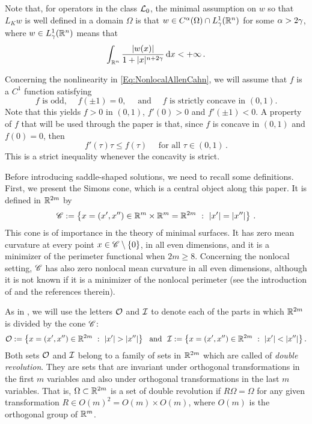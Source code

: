 Note that, for operators in the class $\mathcal{L}_0$, the minimal assumption on $w$ so that $L_K w$ is well defined in a domain $\Omega$ is that $w\in C^\alpha (\Omega)\cap L^1_\gamma(\mathbb{R}^n)$ for some $\alpha > 2\gamma$, where $w\in L^1_\gamma(\mathbb{R}^n)$ means that
$$
\int_{\mathbb{R}^n} \dfrac{|w(x)|}{1+|x|^{n+2\gamma}}\,\mathrm{d} x < +\infty\,.
$$


Concerning the nonlinearity in \eqref{Eq:NonlocalAllenCahn}, we will assume that $f$ is a $C^1$ function satisfying
\begin{equation}
\label{Eq:Hypothesesf}
f \textrm{ is odd, } \quad f(\pm 1)=0, \quad \text{ and } \quad f \textrm{ is strictly concave in }  (0,1).
\end{equation}
Note that this yields $f>0$ in $(0,1)$, $f'(0)>0$ and $f'(\pm 1) < 0$. A property of $f$ that will be used through the paper is that, since $f$ is concave in $(0,1)$ and $f(0)=0$, then 
\begin{equation}
\label{Eq:PropertyConcavityf}
f'(\tau)\tau \leq f(\tau) \quad \textrm{ for all } \tau \in (0,1)\,.
\end{equation}
This is a strict inequality whenever the concavity is strict.

Before introducing saddle-shaped solutions, we need to recall some definitions. First, we present the Simons cone, which is a central object along this paper. It is defined in $\mathbb{R}^{2m}$ by
$$
\mathscr{C} := \left \{ x = (x', x'') \in \mathbb{R}^m \times \mathbb{R}^m = \mathbb{R}^{2m} \ : \ |x'| = |x''| \right \}\,.
$$
This cone is of importance in the theory of minimal surfaces. It has zero mean curvature at every point $x\in \mathscr{C} \setminus \{0\}$, in all even dimensions, and it is a minimizer of the perimeter functional when $2m\geq 8$. Concerning the nonlocal setting, $\mathscr{C}$ has also zero nonlocal mean curvature in all even dimensions, although it is not known if it is a minimizer of the nonlocal perimeter (see the introduction of \cite{Felipe-Sanz-Perela:SaddleFractional} and the references therein).


As in \cite{FelipeSanz-Perela:IntegroDifferentialI}, we will use the letters $\mathcal{O}$ and $\mathcal{I}$ to denote each of the parts in which $\mathbb{R}^{2m}$ is divided by the cone $\mathscr{C}$:
$$
\mathcal{O}:= \left \{ x = (x', x'') \in \mathbb{R}^{2m} \ : \ |x'| > |x''| \right \} \ \textrm{ and } \
\mathcal{I}:= \left \{ x = (x', x'') \in \mathbb{R}^{2m} \ : \ |x'| < |x''| \right \}.
$$
Both sets $\mathcal{O}$ and $\mathcal{I}$ belong to a family of sets in $\mathbb{R}^{2m}$ which are called of \emph{double revolution}. They are sets that are invariant under orthogonal transformations in the first $m$ variables and also under orthogonal transformations in the last $m$ variables. That is, $\Omega\subset \mathbb{R}^{2m}$ is a set of double revolution if $R\Omega = \Omega$ for any given transformation $R\in O(m)^2 = O(m) \times O(m)$, where  $O(m)$ is the orthogonal group of $\mathbb{R}^m$.

